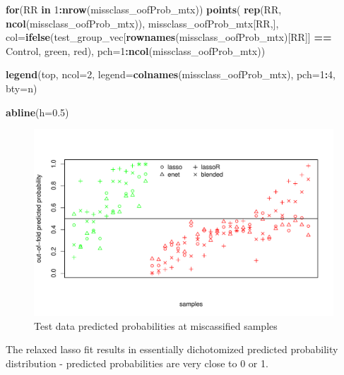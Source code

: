 \documentclass[
]{book}
\newenvironment{Shaded}{\begin{snugshade}}{\end{snugshade}}
\newcommand{\ControlFlowTok}[1]{\textcolor[rgb]{0.13,0.29,0.53}{\textbf{#1}}}
\newcommand{\DataTypeTok}[1]{\textcolor[rgb]{0.13,0.29,0.53}{#1}}
\newcommand{\DecValTok}[1]{\textcolor[rgb]{0.00,0.00,0.81}{#1}}
\newcommand{\FloatTok}[1]{\textcolor[rgb]{0.00,0.00,0.81}{#1}}
\newcommand{\KeywordTok}[1]{\textcolor[rgb]{0.13,0.29,0.53}{\textbf{#1}}}
\newcommand{\NormalTok}[1]{#1}
\newcommand{\OperatorTok}[1]{\textcolor[rgb]{0.81,0.36,0.00}{\textbf{#1}}}
\newcommand{\StringTok}[1]{\textcolor[rgb]{0.31,0.60,0.02}{#1}}
\begin{document}
\begin{Shaded}
\begin{Highlighting}[]
\ControlFlowTok{for}\NormalTok{(RR }\ControlFlowTok{in} \DecValTok{1}\OperatorTok{:}\KeywordTok{nrow}\NormalTok{(missclass\_oofProb\_mtx))}
\KeywordTok{points}\NormalTok{(}
 \KeywordTok{rep}\NormalTok{(RR, }\KeywordTok{ncol}\NormalTok{(missclass\_oofProb\_mtx)), }
\NormalTok{ missclass\_oofProb\_mtx[RR,],}
 \DataTypeTok{col=}\KeywordTok{ifelse}\NormalTok{(test\_group\_vec[}\KeywordTok{rownames}\NormalTok{(missclass\_oofProb\_mtx)[RR]] }\OperatorTok{==}\StringTok{ \textquotesingle{}Control\textquotesingle{}}\NormalTok{,}
  \StringTok{\textquotesingle{}green\textquotesingle{}}\NormalTok{, }\StringTok{\textquotesingle{}red\textquotesingle{}}\NormalTok{),}
 \DataTypeTok{pch=}\DecValTok{1}\OperatorTok{:}\KeywordTok{ncol}\NormalTok{(missclass\_oofProb\_mtx))}

\KeywordTok{legend}\NormalTok{(}\StringTok{\textquotesingle{}top\textquotesingle{}}\NormalTok{, }\DataTypeTok{ncol=}\DecValTok{2}\NormalTok{, }\DataTypeTok{legend=}\KeywordTok{colnames}\NormalTok{(missclass\_oofProb\_mtx), }
 \DataTypeTok{pch=}\DecValTok{1}\OperatorTok{:}\DecValTok{4}\NormalTok{, }\DataTypeTok{bty=}\StringTok{\textquotesingle{}n\textquotesingle{}}\NormalTok{)}

\KeywordTok{abline}\NormalTok{(}\DataTypeTok{h=}\FloatTok{0.5}\NormalTok{)}
\end{Highlighting}
\end{Shaded}

\begin{figure}
\centering
\includegraphics{Static/figures/misclassTest-1.pdf}
\caption{\label{fig:misclassTest}Test data predicted probabilities at miscassified samples}
\end{figure}

The relaxed lasso fit results in essentially dichotomized predicted probability
distribution - predicted probabilities are very close to 0 or 1.
\end{document}

